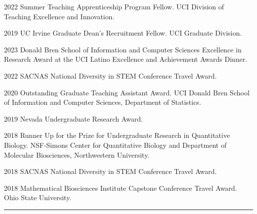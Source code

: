 \documentclass{article}
\begin{document}


\begin{description}
	\vspace{-2mm}
	\item[Fellowships]\hspace*{.1in}

		2022 Summer Teaching Apprenticeship Program Fellow. UCI Division of Teaching Excellence and Innovation.
		\vspace*{1mm}
		
		2019 UC Irvine Graduate Dean's Recruitment Fellow. UCI Graduate Division.

\end{description}
\newpage



\begin{description}
	\vspace{-2mm}
	\item[Awards]\hspace*{.1in}
	
		2023 Donald Bren School of Information and Computer Sciences Excellence in Research Award at the UCI Latino Excellence and Achievement Awards Dinner.
		\vspace*{1mm}
	
		2022 SACNAS National Diversity in STEM Conference Travel Award.
		\vspace*{1mm}
	
		2020 Outstanding Graduate Teaching Assistant Award. UCI Donald Bren School of Information and Computer Sciences, Department of Statistics.
		\vspace*{1mm}
		
		2019 Nevada Undergraduate Research Award.
		\vspace*{1mm}
		
		2018 Runner Up for the Prize for Undergraduate Research in Quantitative Biology. NSF-Simons Center for Quantitative Biology and Department of Molecular Biosciences, Northwestern University.
		\vspace*{1mm}
		
		2018 SACNAS National Diversity in STEM Conference Travel Award.
		\vspace*{1mm}
		
		2018 Mathematical Biosciences Institute Capstone Conference Travel Award. Ohio State University.
	
\end{description}
\vspace{-2mm}
\rule{\linewidth}{1pt}
\end{document}
